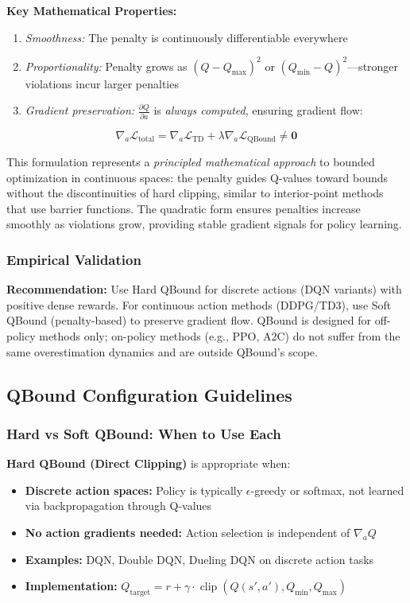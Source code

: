\documentclass[11pt]{article}
\theoremstyle{definition}
\theoremstyle{remark}
\DeclareMathOperator{\clip}{clip}
\begin{document}
\textbf{Key Mathematical Properties:}
\begin{enumerate}
    \item \textit{Smoothness:} The penalty is continuously differentiable everywhere
    \item \textit{Proportionality:} Penalty grows as $(Q - Q_{\max})^2$ or $(Q_{\min} - Q)^2$—stronger violations incur larger penalties
    \item \textit{Gradient preservation:} $\frac{\partial Q}{\partial a}$ is \textit{always computed}, ensuring gradient flow:
\end{enumerate}
\begin{equation}
\nabla_a \mathcal{L}_{\text{total}} = \nabla_a \mathcal{L}_{\text{TD}} + \lambda \nabla_a \mathcal{L}_{\text{QBound}} \neq \mathbf{0}
\end{equation}

This formulation represents a \textit{principled mathematical approach} to bounded optimization in continuous spaces: the penalty guides Q-values toward bounds without the discontinuities of hard clipping, similar to interior-point methods that use barrier functions. The quadratic form ensures penalties increase smoothly as violations grow, providing stable gradient signals for policy learning.

\subsubsection{Empirical Validation}

\textbf{Recommendation:} Use Hard QBound for discrete actions (DQN variants) with positive dense rewards. For continuous action methods (DDPG/TD3), use Soft QBound (penalty-based) to preserve gradient flow. QBound is designed for off-policy methods only; on-policy methods (e.g., PPO, A2C) do not suffer from the same overestimation dynamics and are outside QBound's scope.

\subsection{QBound Configuration Guidelines}

\subsubsection{Hard vs Soft QBound: When to Use Each}

\textbf{Hard QBound (Direct Clipping)} is appropriate when:
\begin{itemize}
    \item \textbf{Discrete action spaces:} Policy is typically $\epsilon$-greedy or softmax, not learned via backpropagation through Q-values
    \item \textbf{No action gradients needed:} Action selection is independent of $\nabla_a Q$
    \item \textbf{Examples:} DQN, Double DQN, Dueling DQN on discrete action tasks
    \item \textbf{Implementation:} $Q_{\text{target}} = r + \gamma \cdot \clip(Q(s',a'), Q_{\min}, Q_{\max})$
\end{itemize}
\end{document}
